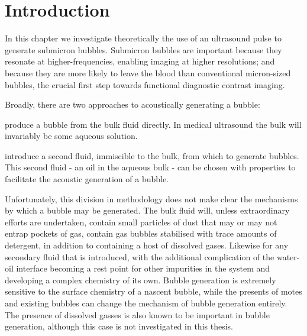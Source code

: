 
\section{Introduction}
In this chapter we investigate theoretically the use of an ultrasound pulse to generate submicron bubbles.
Submicron bubbles are important because they
resonate at higher-frequencies, enabling imaging at higher resolutions;
and because 
they are more likely to leave the blood than conventional micron-sized bubbles,
the crucial first step towards functional diagnostic contrast imaging.

Broadly, there are two approaches to acoustically generating a bubble:
\nlist
{
  \item produce a bubble from the bulk fluid directly.  
In medical ultrasound the bulk will invariably be some aqueous solution.
  \item introduce a second fluid, immiscible to the bulk, from which to generate bubbles.
This second fluid - an oil in the aqueous bulk - 
can be chosen with properties to facilitate the acoustic generation of a bubble.\label{item:nuc:oil}
}
Unfortunately, this division in methodology does not make clear the mechanisms
by which a bubble may be generated. %
The bulk fluid will, unless extraordinary efforts are undertaken,
contain small particles of dust that may or may not entrap pockets of gas,
contain gas bubbles stabilised with trace amounts of detergent,
in addition to containing a host of dissolved gases.
Likewise for any secondary fluid that is introduced,
with the additional complication of the water-oil interface 
becoming a rest point for other impurities in the system and 
developing a complex chemistry of its own.
Bubble generation is extremely sensitive to the surface chemistry of a nascent bubble\cite{Talanquer2000},
while the presents of motes and existing bubbles can change the
mechanism of bubble generation entirely.
The presence of dissolved gasses is also known to be important in bubble generation\cite{Talanquer2001},
although this case is not investigated in this thesis.




